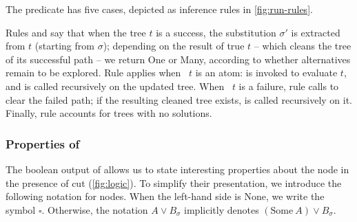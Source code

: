 \documentclass[sigplan,10pt,anonymous,review]{acmart}
\begin{document}
The \run predicate has five cases, depicted as inference rules in \cref{fig:run-rules}.



Rules \stopot and \stopt say that when the tree $t$ is a success, the
substitution $\sigma'$ is extracted from $t$ (starting from $\sigma$); depending
on the result of \na true $t$ -- which cleans the tree of its successful
path -- we return One or Many, according to whether alternatives remain
to be explored. Rule \stept applies when \pathend\ $t$ is an atom: \step is invoked to
evaluate $t$, and \run is called recursively on the updated tree. When \pathend\ $t$ is a failure, rule \backt calls \na
to clear the failed path; if the resulting cleaned tree exists, \run is
called recursively on it. Finally, rule \failt accounts for trees with no
solutions.


\subsubsection{Properties of \run}
\label{sec:run-prop}


% 


The boolean output of \run allows us to state interesting properties about the
\orC node in the presence of cut (\cref{fig:logic}).
To simplify their presentation, we introduce the
following notation for \orC nodes. When the left-hand side is $\mathrm{None}$,
we write the symbol $\square$. Otherwise, the notation $A \lor B_\sigma$
implicitly denotes $(\mathrm{Some}\ A) \lor B_\sigma$.
\end{document}
